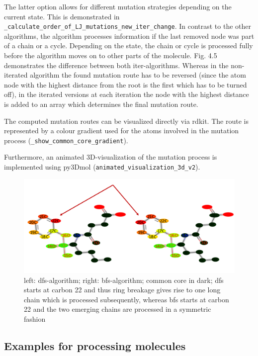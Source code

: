 The latter option allows for different mutation strategies depending
on the current state. This is demonstrated in \texttt{\_calculate\_order\_of\_LJ\_mutations\_new\_iter\_change}.
In contrast to the other algorithms, the algorithm processes information
if the last removed node was part of a chain or a cycle. Depending
on the state, the chain or cycle is processed fully before the algorithm
moves on to other parts of the molecule. Fig. 4.5 demonstrates the difference between both iter-algorithms.
Whereas in the non-iterated algorithm the found mutation route has to be reversed (since the atom node with the highest distance from the root is the first which has to be turned off), in the iterated versions at each iteration the node with the highest distance is added to an array which determines the final mutation route.

The computed mutation routes can be visualized directly via rdkit.
The route is represented by a colour gradient used for the atoms involved
in the mutation process (\texttt{\_show\_common\_core\_gradient}). 

Furthermore, an animated 3D-visualization of the mutation process
is implemented using py3Dmol (\texttt{animated\_visualization\_3d\_v2})\cite{key-4}. 

\begin{figure}
\includegraphics[scale=0.4]{simple_ring_exampledfs.png}

\caption{left: dfs-algorithm; right: bfs-algorithm; common core in dark; dfs
starts at carbon 22 and thus ring breakage gives rise to one long
chain which is processed subsequently, whereas bfs starts at carbon
22 and the two emerging chains are processed in a symmetric fashion
}

\end{figure}


\subsection{Examples for processing molecules}

